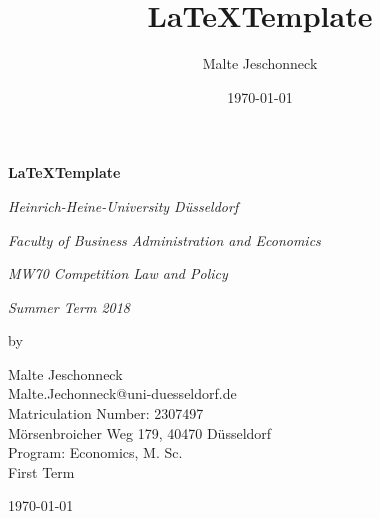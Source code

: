 \documentclass[a4paper]{scrartcl}
\begin{document}
	
	\def\sectionautorefname{section}
	\def\equationautorefname{equation}
	
	
	
	
	\title{\LaTeX Template}
	\author{Malte Jeschonneck}
	\date{\today}
	\maketitle
	
	\newpage
	
	\begin{titlepage}
		\centering
		\vspace{1cm}
		{\Large\bfseries \LaTeX Template \par}
		\vspace{4cm}
		{\large\itshape Heinrich-Heine-University Düsseldorf\par}
		\vspace{0.5cm}
		{\large\itshape Faculty of Business Administration and Economics\par}
		\vspace{0.5cm}
		{\large\itshape MW70 Competition Law and Policy\par}
		\vspace{0.5cm}
		{\large\itshape Summer Term 2018\par}
		{\large\itshape \par}
		\vfill
		by\par
		\vspace{0.5cm}
		Malte Jeschonneck\\
		Malte.Jechonneck@uni-duesseldorf.de\\
		Matriculation Number: 2307497\\
		Mörsenbroicher Weg 179, 40470 Düsseldorf\\
		Program: Economics, M. Sc.\\
		First Term
		
		
		\vfill
		
		{\large \today\par}
	\end{titlepage}

\newpage
	
	
	\tableofcontents
	\newpage
	\listoffigures
	\newpage
	\listoftables
	\newpage
	
	
	
	
	
	
	
	
	
\end{document}
